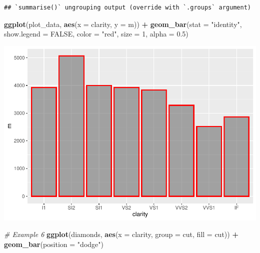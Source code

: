 \documentclass[
]{book}
\newenvironment{Shaded}{\begin{snugshade}}{\end{snugshade}}
\newcommand{\CommentTok}[1]{\textcolor[rgb]{0.56,0.35,0.01}{\textit{#1}}}
\newcommand{\DataTypeTok}[1]{\textcolor[rgb]{0.13,0.29,0.53}{#1}}
\newcommand{\DecValTok}[1]{\textcolor[rgb]{0.00,0.00,0.81}{#1}}
\newcommand{\FloatTok}[1]{\textcolor[rgb]{0.00,0.00,0.81}{#1}}
\newcommand{\KeywordTok}[1]{\textcolor[rgb]{0.13,0.29,0.53}{\textbf{#1}}}
\newcommand{\NormalTok}[1]{#1}
\newcommand{\OperatorTok}[1]{\textcolor[rgb]{0.81,0.36,0.00}{\textbf{#1}}}
\newcommand{\OtherTok}[1]{\textcolor[rgb]{0.56,0.35,0.01}{#1}}
\newcommand{\StringTok}[1]{\textcolor[rgb]{0.31,0.60,0.02}{#1}}
\begin{document}
\begin{Shaded}
\end{Shaded}

\begin{verbatim}
## `summarise()` ungrouping output (override with `.groups` argument)
\end{verbatim}

\begin{Shaded}
\begin{Highlighting}[]
\KeywordTok{ggplot}\NormalTok{(plot_data, }\KeywordTok{aes}\NormalTok{(}\DataTypeTok{x =}\NormalTok{ clarity,}
    \DataTypeTok{y =}\NormalTok{ m)) }\OperatorTok{+}\StringTok{ }\KeywordTok{geom_bar}\NormalTok{(}\DataTypeTok{stat =} \StringTok{"identity"}\NormalTok{,}
    \DataTypeTok{show.legend =} \OtherTok{FALSE}\NormalTok{,}
    \DataTypeTok{color =} \StringTok{"red"}\NormalTok{, }\DataTypeTok{size =} \DecValTok{1}\NormalTok{,}
    \DataTypeTok{alpha =} \FloatTok{0.5}\NormalTok{)}
\end{Highlighting}
\end{Shaded}

\includegraphics{_main_files/figure-latex/unnamed-chunk-256-6.pdf}

\begin{Shaded}
\begin{Highlighting}[]
\CommentTok{# Example 6}
\KeywordTok{ggplot}\NormalTok{(diamonds, }\KeywordTok{aes}\NormalTok{(}\DataTypeTok{x =}\NormalTok{ clarity,}
    \DataTypeTok{group =}\NormalTok{ cut, }\DataTypeTok{fill =}\NormalTok{ cut)) }\OperatorTok{+}
\StringTok{    }\KeywordTok{geom_bar}\NormalTok{(}\DataTypeTok{position =} \StringTok{"dodge"}\NormalTok{)}
\end{Highlighting}
\end{Shaded}
\end{document}
